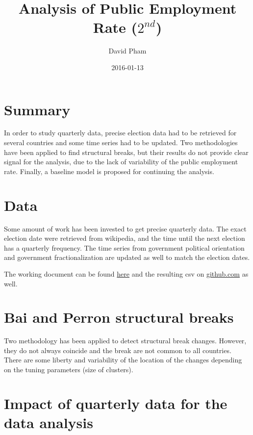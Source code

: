 \documentclass[]{article}
\title{Analysis of Public Employment Rate ($2^{nd}$)}
\author{David Pham}
\date{2016-01-13}
\begin{document}
\maketitle

\section{Summary}\label{summary}

In order to study quarterly data, precise election data had to be
retrieved for several countries and some time series had to be updated.
Two methodologies have been applied to find structural breaks, but their
results do not provide clear signal for the analysis, due to the lack of
variability of the public employment rate. Finally, a baseline model is
proposed for continuing the analysis.

\section{Data}\label{data}

Some amount of work has been invested to get precise quarterly data. The
exact election date were retrieved from wikipedia, and the time until
the next election has a quarterly frequency. The time series from
government political orientation and government fractionalization are
updated as well to match the election dates.

The working document can be found
\href{https://github.com/davidpham87/public_employment_analysis/blob/master/PublicEmploymentAnalysis/data/manual_data_entry/transform_yearly_to_quarterly_elections.org}{here}
and the resulting csv on
\href{https://github.com/davidpham87/public_employment_analysis/blob/master/PublicEmploymentAnalysis/data/execrlc_govfrac_yrcurnt_quartery_cleaned.csv}{github.com}
as well.

\section{Bai and Perron structural
breaks}\label{bai-and-perron-structural-breaks}

Two methodology has been applied to detect structural break changes.
However, they do not always coincide and the break are not common to all
countries. There are some liberty and variability of the location of the
changes depending on the tuning parameters (size of clusters).

\section{Impact of quarterly data for the data
analysis}\label{impact-of-quarterly-data-for-the-data-analysis}
\end{document}
